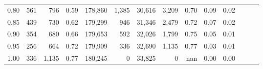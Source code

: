 \begin{tabular}{rrrrrrrrrrrrrr}
0.80 &     561 &    796 &  0.59 &  178,860 &    1,385 &  30,616 &   3,209 &  0.70 &  0.09 &      0.02 \\
0.85 &     439 &    730 &  0.62 &  179,299 &      946 &  31,346 &   2,479 &  0.72 &  0.07 &      0.02 \\
0.90 &     354 &    680 &  0.66 &  179,653 &      592 &  32,026 &   1,799 &  0.75 &  0.05 &      0.01 \\
0.95 &     256 &    664 &  0.72 &  179,909 &      336 &  32,690 &   1,135 &  0.77 &  0.03 &      0.01 \\
1.00 &     336 &  1,135 &  0.77 &  180,245 &        0 &  33,825 &       0 &   nan &  0.00 &      0.00 \\
\bottomrule
\end{tabular}
